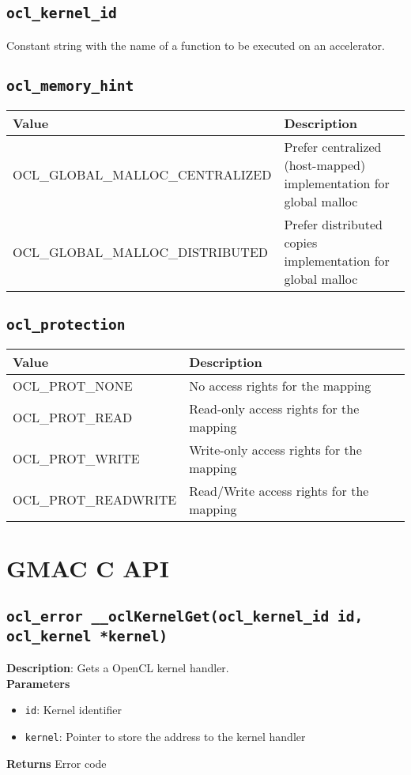 \subsection{\texttt{ocl\_kernel\_id}}

Constant string with the name of a function to be executed on an accelerator.

\subsection{\texttt{ocl\_memory\_hint}}

\begin{tabular}{|l|l|}
  \hline
  Value & Description \\
  \hline
  \hline
  OCL\_GLOBAL\_MALLOC\_CENTRALIZED & Prefer centralized (host\hyp{}mapped) implementation for global 
  malloc \\
  OCL\_GLOBAL\_MALLOC\_DISTRIBUTED & Prefer distributed copies implementation for global malloc \\
  \hline
\end{tabular}


\subsection{\texttt{ocl\_protection}}

\begin{tabular}{|l|l|}
  \hline
  Value & Description \\
  \hline
  \hline
  OCL\_PROT\_NONE  & No access rights for the mapping \\
  OCL\_PROT\_READ  & Read\hyp{}only access rights for the mapping \\
  OCL\_PROT\_WRITE & Write\hyp{}only access rights for the mapping \\
  OCL\_PROT\_READWRITE & Read\slash{}Write access rights for the mapping \\
  \hline
\end{tabular}

\section{GMAC C API}

\subsection{\texttt{ocl\_error \_\_oclKernelGet(ocl\_kernel\_id id, ocl\_kernel *kernel)}}

\textbf{Description}: Gets a OpenCL kernel handler. \\
\textbf{Parameters}
\begin{itemize}
  \item \texttt{id}: Kernel identifier
  \item \texttt{kernel}: Pointer to store the address to the kernel handler
\end{itemize}
\textbf{Returns} Error code


